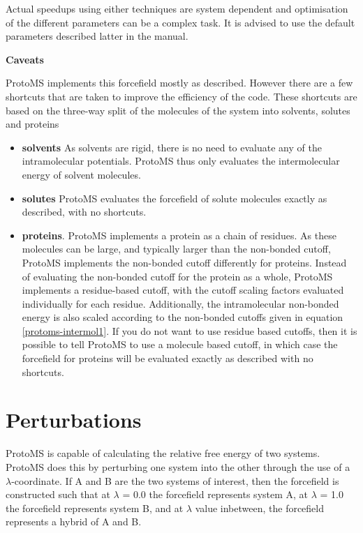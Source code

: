 \documentclass[letterpaper,10pt,english]{sphinxmanual}
\begin{document}
Actual speedups using either techniques are system dependent and optimisation of the different parameters can be a complex task. It is advised to use the default parameters described latter in the manual.

\textbf{Caveats}

ProtoMS implements this forcefield mostly as described. However there are a few shortcuts that are taken to improve the efficiency of the code. These shortcuts are based on the three-way split of the molecules of the system into solvents, solutes and proteins
\begin{itemize}
\item {} 
\textbf{solvents} As solvents are rigid, there is no need to evaluate any of the intramolecular potentials. ProtoMS thus only evaluates the intermolecular energy of solvent molecules.

\item {} 
\textbf{solutes} ProtoMS evaluates the forcefield of solute molecules exactly as described, with no shortcuts.

\item {} 
\textbf{proteins}. ProtoMS implements a protein as a chain of residues. As these molecules can be large, and typically larger than the non-bonded cutoff, ProtoMS implements the non-bonded cutoff differently for proteins. Instead of evaluating the non-bonded cutoff for the protein as a whole, ProtoMS implements a residue-based cutoff, with the cutoff scaling factors evaluated individually for each residue. Additionally, the intramolecular non-bonded energy is also scaled according to the non-bonded cutoffs given in equation \eqref{protoms-intermol1}. If you do not want to use residue based cutoffs, then it is possible to tell ProtoMS to use a molecule based cutoff, in which case the forcefield for proteins will be evaluated exactly as described with no shortcuts.

\end{itemize}


\section{Perturbations}
\label{protoms:index-14}\label{protoms:perturbations}
ProtoMS is capable of calculating the relative free energy of two systems. ProtoMS does this by perturbing one system into the other through the use of a \(\lambda\)-coordinate. If A and B are the two systems of interest, then the forcefield is constructed such that at \(\lambda\) = 0.0 the forcefield represents system A, at \(\lambda\) = 1.0 the forcefield represents system B, and at \(\lambda\) value inbetween, the forcefield represents a hybrid of A and B.
\end{document}
